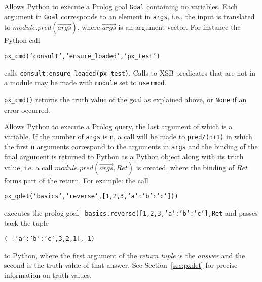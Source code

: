 \begin{description}

%
  Allows Python to execute a Prolog goal {\tt Goal} containing no
  variables.  Each argument in {\tt Goal} corresponds to an element
  in {\tt args}, i.e., the input is translated to
  $module.pred(\vec{args})$, where $\vec{args}$ is an argument vector.
  For instance the Python call

  {\tt px\_cmd('consult','ensure\_loaded','px\_test')}

  calls {\tt consult:ensure\_loaded(px\_test)}.  Calls to XSB
  predicates that are not in a module may be made with {\tt module}
  set to {\tt usermod}.

  {\tt px\_cmd()} returns the truth value of the goal as explained
  above, or {\tt None} if an error occurred.
  
%
  Allows Python to execute a Prolog query, the last argument of which
  is a variable.  If the number of {\tt args} is {\tt n}, a call will
  be made to {\tt pred/(n+1)} in which the first {\tt n} arguments
  correspond to the arguments in {\tt args} and the binding of the 
  final argument is returned to Python as a Python object along with
  its truth value, i.e. a call $module.pred(\vec{args},Ret)$ is
  created, where the binding of $Ret$ forms part of the return.  For
  example: the call

  {\tt px\_qdet('basics','reverse',[1,2,3,{'a':{'b':'c'}}]))}

  \noindent
  executes the prolog goal {\tt
    basics.reverse([1,2,3,{'a':{'b':'c'}}],Ret} and passes back the tuple

  {\tt ( [{'a':{'b':'c'}},3,2,1], 1)}

  \noindent
  to Python, where the first argument of the {\em return tuple} is the
  {\em answer} and the second is the truth value of that answer.  See
  Section~\ref{sec:pxdet} for precise information on truth values.


\end{description}
